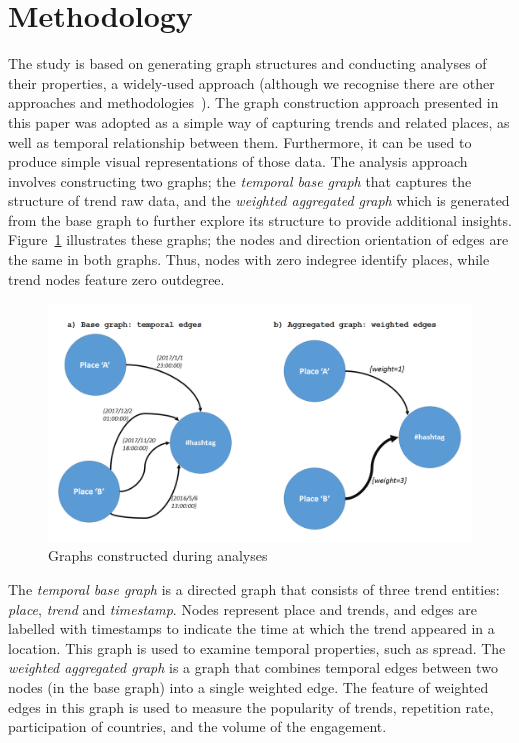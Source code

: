 \documentclass{llncs}
\begin{document}
\section{Methodology}\label{method}

The study is based on generating graph structures and conducting
analyses of their properties, a widely-used approach (although we
recognise there are other approaches and
methodologies~\cite{tufekci:2014}). The graph construction approach
presented in this paper was adopted as a simple way of capturing
trends and related places, as well as temporal relationship between
them. Furthermore, it can be used to produce simple visual
representations of those data. The analysis approach involves
constructing two graphs; the {\emph{temporal base graph}} that
captures the structure of trend raw data, and the {\emph{weighted
aggregated graph}} which is generated from the base graph to further
explore its structure to provide additional
insights. Figure~\ref{fig:graphexamples} illustrates these graphs; the
nodes and direction orientation of edges are the same in both
graphs. Thus, nodes with zero indegree identify places, while trend
nodes feature zero outdegree.

\begin{figure}[!htb] \centering
\includegraphics[width=\columnwidth]{images/graphexamples.png}
\caption{Graphs constructed during analyses}
\label{fig:graphexamples}
\end{figure}

The {\emph{temporal base graph}} is a directed graph that consists of
three trend entities: {\emph{place}}, {\emph{trend}} and
{\emph{timestamp}}. Nodes represent place and trends, and edges are
labelled with timestamps to indicate the time at which the trend
appeared in a location. This graph is used to examine temporal
properties, such as spread. The {\emph{weighted aggregated graph}} is
a graph that combines temporal edges between two nodes (in the base
graph) into a single weighted edge. The feature of weighted edges in
this graph is used to measure the popularity of trends, repetition
rate, participation of countries, and the volume of the engagement.
\end{document}

